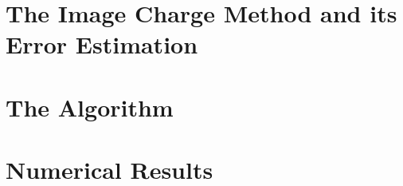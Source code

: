 \section{The Image Charge Method and its Error Estimation}

\section{The Algorithm}

\section{Numerical Results}

